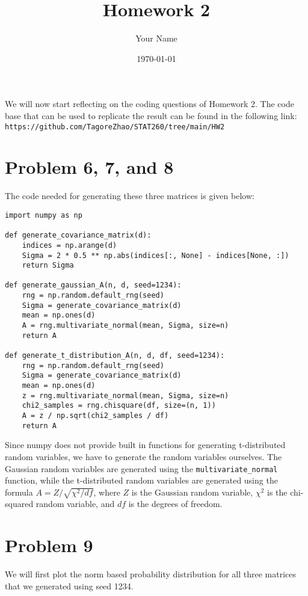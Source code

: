 \documentclass{article}
\title{Homework 2}
\author{Your Name}
\date{\today}
\begin{document}
\maketitle


We will now start reflecting on the coding questions of Homework 2. The code base that can be used to replicate the result can be found
in the following link: \texttt{https://github.com/TagoreZhao/STAT260/tree/main/HW2}

\section{Problem 6, 7, and 8}

The code needed for generating these three matrices is given below:

\begin{lstlisting}[caption={Python code for generating matrices}]
import numpy as np

def generate_covariance_matrix(d):
    indices = np.arange(d)
    Sigma = 2 * 0.5 ** np.abs(indices[:, None] - indices[None, :])
    return Sigma

def generate_gaussian_A(n, d, seed=1234):
    rng = np.random.default_rng(seed)
    Sigma = generate_covariance_matrix(d)
    mean = np.ones(d)
    A = rng.multivariate_normal(mean, Sigma, size=n)
    return A

def generate_t_distribution_A(n, d, df, seed=1234):
    rng = np.random.default_rng(seed)
    Sigma = generate_covariance_matrix(d)
    mean = np.ones(d)
    z = rng.multivariate_normal(mean, Sigma, size=n)
    chi2_samples = rng.chisquare(df, size=(n, 1))
    A = z / np.sqrt(chi2_samples / df)
    return A
\end{lstlisting}
Since numpy does not provide built in functions for generating t-distributed random variables, we have to generate the random variables
ourselves. The Gaussian random variables are generated using the \texttt{multivariate\_normal}
function, while the t-distributed random variables are generated using the formula $A = Z / \sqrt{\chi^2 / df}$, where $Z$ is the Gaussian
random variable, $\chi^2$ is the chi-squared random variable, and $df$ is the degrees of freedom.
\newpage


\section*{Problem 9}

We will first plot the norm based probability distribution for all three matrices that we generated using seed 1234.
\end{document}
